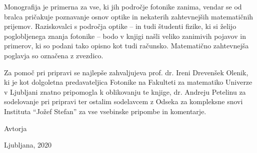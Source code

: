 \documentclass[11pt,fleqn]{book} %
\begin{document}
Monografija je primerna za vse, ki jih področje fotonike zanima, 
vendar se od bralca pričakuje poznavanje osnov optike in nekaterih 
zahtevnejših matematičnih prijemov. Raziskovalci s področja optike 
-- in tudi študenti fizike, ki si želijo poglobljenega znanja fotonike -- 
bodo v knjigi našli veliko zanimivih pojavov in primerov, ki so podani tako opisno kot tudi 
računsko. Matematično zahtevnejša poglavja so označena z zvezdico.

Za pomoč pri pripravi se najlepše zahvaljujeva prof. dr. Ireni Drevenšek Olenik, ki je 
kot dolgoletna predavateljica Fotonike na Fakulteti za matematiko Univerze v Ljubljani
znatno pripomogla k oblikovanju te knjige, dr. Andreju Petelinu za sodelovanje pri pripravi ter 
ostalim sodelavcem z Odseka za kompleksne snovi Instituta ``Jožef Stefan'' za vse vsebinske pripombe
in komentarje.

\vspace{1em}

Avtorja

\hfill Ljubljana, 2020


\cleardoublepage
\thispagestyle{empty}
\mbox{}
\cleardoublepage














\end{document}

